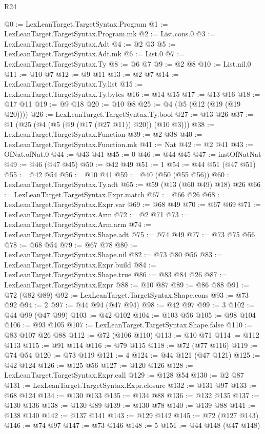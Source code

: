 \begin{lexlean}{R24}
\begin{coremodule}
@0 := LexLeanTarget.TargetSyntax.Program
@1 := LexLeanTarget.TargetSyntax.Program.mk
@2 := List.cons.{0}
@3 := LexLeanTarget.TargetSyntax.Adt
@4 := @2 @3
@5 := LexLeanTarget.TargetSyntax.Adt.mk
@6 := List.{0}
@7 := LexLeanTarget.TargetSyntax.Ty
@8 := @6 @7
@9 := @2 @8
@10 := List.nil.{0}
@11 := @10 @7
@12 := @9 @11
@13 := @2 @7
@14 := LexLeanTarget.TargetSyntax.Ty.list
@15 := LexLeanTarget.TargetSyntax.Ty.bytes
@16 := @14 @15
@17 := @13 @16
@18 := @17 @11
@19 := @9 @18
@20 := @10 @8
@25 := @4 (@5 (@12 (@19 (@19 @20))))
@26 := LexLeanTarget.TargetSyntax.Ty.bool
@27 := @13 @26
@37 := @1 (@25 (@4 (@5 (@9 (@17 (@27 @11)) @20)) (@10 @3)))
@38 := LexLeanTarget.TargetSyntax.Function
@39 := @2 @38
@40 := LexLeanTarget.TargetSyntax.Function.mk
@41 := Nat
@42 := @2 @41
@43 := OfNat.ofNat.{0}
@44 := @43 @41
@45 := 0
@46 := @44 @45
@47 := instOfNatNat
@49 := @46 (@47 @45)
@50 := @42 @49
@51 := 1
@54 := @44 @51 (@47 @51)
@55 := @42 @54
@56 := @10 @41
@59 := @40 (@50 (@55 @56))
@60 := LexLeanTarget.TargetSyntax.Ty.adt
@65 := @59 (@13 (@60 @49) @18) @26
@66 := LexLeanTarget.TargetSyntax.Expr.match
@67 := @66 @26
@68 := LexLeanTarget.TargetSyntax.Expr.var
@69 := @68 @49
@70 := @67 @69
@71 := LexLeanTarget.TargetSyntax.Arm
@72 := @2 @71
@73 := LexLeanTarget.TargetSyntax.Arm.arm
@74 := LexLeanTarget.TargetSyntax.Shape.adt
@75 := @74 @49
@77 := @73 @75 @56
@78 := @68 @54
@79 := @67 @78
@80 := LexLeanTarget.TargetSyntax.Shape.nil
@82 := @73 @80 @56
@83 := LexLeanTarget.TargetSyntax.Expr.build
@84 := LexLeanTarget.TargetSyntax.Shape.true
@86 := @83 @84 @26
@87 := LexLeanTarget.TargetSyntax.Expr
@88 := @10 @87
@89 := @86 @88
@91 := @72 (@82 @89)
@92 := LexLeanTarget.TargetSyntax.Shape.cons
@93 := @73 @92
@94 := 2
@97 := @44 @94 (@47 @94)
@98 := @42 @97
@99 := 3
@102 := @44 @99 (@47 @99)
@103 := @42 @102
@104 := @103 @56
@105 := @98 @104
@106 := @93 @105
@107 := LexLeanTarget.TargetSyntax.Shape.false
@110 := @83 @107 @26 @88
@112 := @72 (@106 @110)
@113 := @10 @71
@114 := @112 @113
@115 := @91 @114
@116 := @79 @115
@118 := @72 (@77 @116)
@119 := @74 @54
@120 := @73 @119
@121 := 4
@124 := @44 @121 (@47 @121)
@125 := @42 @124
@126 := @125 @56
@127 := @120 @126
@128 := LexLeanTarget.TargetSyntax.Expr.call
@129 := @128 @54
@130 := @2 @87
@131 := LexLeanTarget.TargetSyntax.Expr.closure
@132 := @131 @97
@133 := @68 @124
@134 := @130 @133
@135 := @134 @88
@136 := @132 @135
@137 := @130 @136
@138 := @130 @89
@139 := @130 @78
@140 := @139 @88
@141 := @138 @140
@142 := @137 @141
@143 := @129 @142
@145 := @72 (@127 @143)
@146 := @74 @97
@147 := @73 @146
@148 := 5
@151 := @44 @148 (@47 @148)

\end{coremodule}
\end{lexlean}
